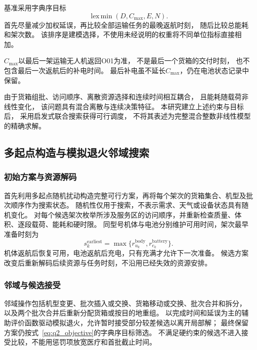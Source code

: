 \documentclass[bwprint]{gmcmthesis}
\begin{document}
基准采用字典序目标
\begin{equation}
    \operatorname{lex\,min}
    \left(D,C_{\max},E,N\right).
    \label{eq:q2_objective}
\end{equation}
首先尽量减少加权延误，再比较全部运输任务的最晚返航时刻，
随后比较总能耗和架次数。
该排序是建模选择，不使用未经说明的权重将不同单位指标直接相加。

$C_{\max}$以最后一架运输无人机返回O01为准，
不是最后一个货箱的交付时刻，
也不包含最后一次返航后的补电时间。
最后补电虽不延长$C_{\max}$，仍在电池状态记录中保留。

由于货箱组批、访问顺序、离散资源选择和连续时间相互耦合，
且能耗随载荷非线性变化，
该问题具有混合离散与连续决策特征。
本研究建立上述约束与目标后，
采用启发式联合搜索获得可行调度，
不将其表述为完整混合整数非线性模型的精确求解。

\subsection{多起点构造与模拟退火邻域搜索}
\subsubsection{初始方案与资源解码}
首先利用多起点随机扰动构造完整可行方案，再将每个架次的货箱集合、机型及批次顺序作为搜索状态。
随机性仅用于搜索，不表示需求、天气或设备状态具有随机变化。
对每个候选架次枚举所涉及服务区的访问顺序，并重新检查质量、体积、逐段载荷、能耗和硬时限。
同型号机体与电池分别维护可用时间，架次最早准备时刻为
\begin{equation}
s_k^{\mathrm{earliest}}=\max\{r_{u_k}^{\mathrm{body}},r_{e_k}^{\mathrm{battery}}\}.
\end{equation}
机体返航后恢复可用，电池返航后充电，只有充满才允许下一次准备。
候选方案改变后重新解码后续资源与任务时刻，不沿用已经失效的资源安排。

\subsubsection{邻域与候选接受}
邻域操作包括机型变更、批次插入或交换、货箱移动或交换、批次合并和拆分，
以及两个批次合并后重新分配货箱或按目的地重组。
以完成时间和延误为主的辅助评价函数驱动模拟退火，允许暂时接受部分较差候选以离开局部解；
最终保留方案仍按式~\eqref{eq:q2_objective}的字典序目标筛选。
不满足硬约束的候选不进入接受比较，不能用惩罚项放宽医疗和首批截止时间。
\end{document}
